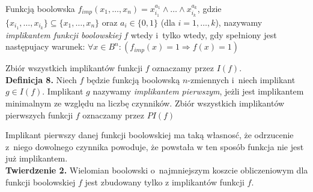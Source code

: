 \documentclass[a4paper,11pt,twoside]{article}
\theoremstyle{definition}
\begin{document}
Funkcją boolowska $f_{imp}(x_1,\dots,x_n) = x_{i_1}^{a_1} \wedge \dots \wedge x_{i_k}^{a_k}$, gdzie $\{x_{i_1},\dots,x_{i_k}\} \subseteq \{x_{1},\dots,x_{n}\}$ oraz $a_i \in \{0,1\}$ (dla $i=1,\dots,k$), nazywamy {\em implikantem funkcji boolowskiej} $f$ wtedy i~tylko wtedy, gdy spełniony jest następujacy warunek: $\forall x \in B^n \colon (f_{imp}(x) = 1 \Rightarrow f(x) = 1)$

Zbiór wszystkich implikantów funkcji $f$ oznaczamy przez $I(f)$.\\
\newline
\textbf{Definicja 8.} Niech $f$ będzie funkcją boolowską $n$-zmiennych i~niech implikant $g \in I(f)$.  Implikant $g$ nazywamy {\em implikantem pierwszym}, jeżli jest implikantem minimalnym ze względu na liczbę czynników. Zbiór wszystkich implikantów pierwszych funkcji $f$ oznaczamy przez $\mathit{PI}(f)$

Implikant pierwszy danej funkcji boolowskiej ma taką własnosć, że odrzucenie z~niego dowolnego czynnika powoduje, że powstała  w ten sposób funkcja nie jest już implikantem.\\
\newline
\textbf{Twierdzenie 2.} Wielomian boolowski o~najmniejszym koszcie obliczeniowym dla funkcji boolowskiej $f$ jest zbudowany tylko z implikantów funkcji $f$.
\end{document}
